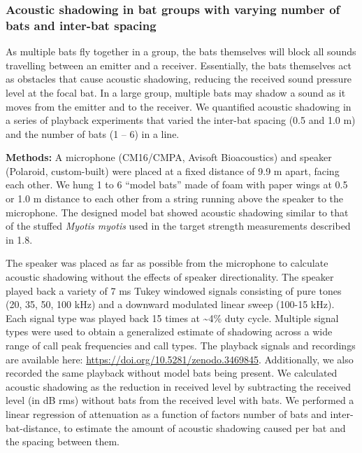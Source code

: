 \documentclass[
]{book}
\begin{document}
\hypertarget{acoustic-shadowing-in-bat-groups-with-varying-number-of-bats-and-inter-bat-spacing}{%
\subsubsection{\texorpdfstring{Acoustic shadowing in bat groups with varying number of bats and inter-bat spacing \label{cpn_shadowing}}{Acoustic shadowing in bat groups with varying number of bats and inter-bat spacing }}\label{acoustic-shadowing-in-bat-groups-with-varying-number-of-bats-and-inter-bat-spacing}}

As multiple bats fly together in a group, the bats themselves will block all sounds travelling between an emitter and a receiver. Essentially, the bats themselves act as obstacles that cause acoustic shadowing, reducing the received sound pressure level at the focal bat. In a large group, multiple bats may shadow a sound as it moves from the emitter and to the receiver. We quantified acoustic shadowing in a series of playback experiments that varied the inter-bat spacing (0.5 and 1.0 m) and the number of bats (1 -- 6) in a line.

\textbf{Methods:} A microphone (CM16/CMPA, Avisoft Bioacoustics) and speaker
(Polaroid, custom-built) were placed at a fixed distance of 9.9 m apart, facing each other. We hung 1 to 6 ``model bats'' made of foam with paper wings at 0.5 or 1.0 m distance to each other from a string running above the speaker to the microphone. The designed model bat showed acoustic shadowing similar to that of the stuffed \emph{Myotis myotis} used in the target strength measurements described in 1.8.

The speaker was placed as far as possible from the microphone to calculate
acoustic shadowing without the effects of speaker directionality. The speaker
played back a variety of 7 ms Tukey windowed signals consisting of pure tones
(20, 35, 50, 100 kHz) and a downward modulated linear sweep (100-15 kHz). Each
signal type was played back 15 times at \textasciitilde4\% duty cycle. Multiple signal types were used to obtain a generalized estimate of shadowing across a wide range of call peak frequencies and call types. The playback signals and recordings are available here: \url{https://doi.org/10.5281/zenodo.3469845}. Additionally, we also recorded the same playback without model bats being present. We calculated acoustic shadowing as the reduction in received level by subtracting the received level (in dB rms) without bats from the received level with bats. We performed a linear regression of attenuation as a function of factors number of bats and inter-bat-distance, to estimate the amount of acoustic shadowing caused per bat and the spacing between them.
\end{document}
